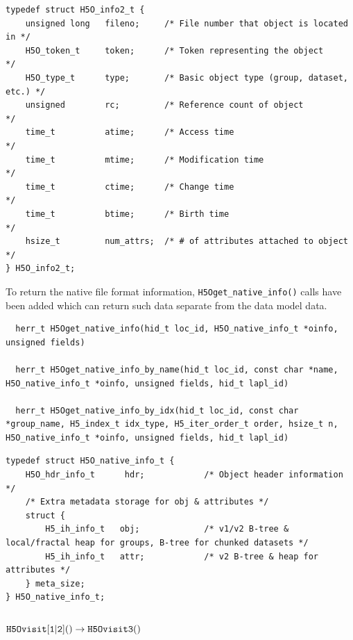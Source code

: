 \begin{lstlisting}
typedef struct H5O_info2_t {
    unsigned long   fileno;     /* File number that object is located in */
    H5O_token_t     token;      /* Token representing the object        */
    H5O_type_t      type;       /* Basic object type (group, dataset, etc.) */
    unsigned        rc;         /* Reference count of object            */
    time_t          atime;      /* Access time                          */
    time_t          mtime;      /* Modification time                    */
    time_t          ctime;      /* Change time                          */
    time_t          btime;      /* Birth time                           */
    hsize_t         num_attrs;  /* # of attributes attached to object   */
} H5O_info2_t;
\end{lstlisting}

To return the native file format information, {\tt H5Oget\_native\_info()} calls
have been added which can return such data separate from the data model data.

\begin{lstlisting}
  herr_t H5Oget_native_info(hid_t loc_id, H5O_native_info_t *oinfo, unsigned fields)

  herr_t H5Oget_native_info_by_name(hid_t loc_id, const char *name, H5O_native_info_t *oinfo, unsigned fields, hid_t lapl_id)

  herr_t H5Oget_native_info_by_idx(hid_t loc_id, const char *group_name, H5_index_t idx_type, H5_iter_order_t order, hsize_t n, H5O_native_info_t *oinfo, unsigned fields, hid_t lapl_id)
\end{lstlisting}

\begin{lstlisting}
typedef struct H5O_native_info_t {                                               
    H5O_hdr_info_t      hdr;            /* Object header information */          
    /* Extra metadata storage for obj & attributes */                            
    struct {                                                                     
        H5_ih_info_t   obj;             /* v1/v2 B-tree & local/fractal heap for groups, B-tree for chunked datasets */
        H5_ih_info_t   attr;            /* v2 B-tree & heap for attributes */    
    } meta_size;                                                                 
} H5O_native_info_t;
\end{lstlisting}


\subsubsection{${\tt H5Ovisit[1|2]()} \rightarrow {\tt H5Ovisit3()}$}

